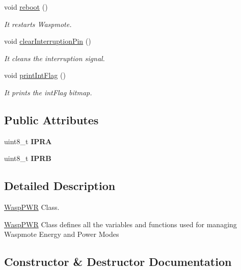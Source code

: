 \begin{DoxyCompactItemize}
void \hyperlink{class_wasp_p_w_r_a6cd2a849cbdeb7a525b39da989cf0283}{reboot} ()
\begin{DoxyCompactList}\small\item\em It restarts Waspmote. \end{DoxyCompactList}\item 
void \hyperlink{class_wasp_p_w_r_aefed3fd8e97164117415b18b475fca61}{clear\+Interruption\+Pin} ()
\begin{DoxyCompactList}\small\item\em It cleans the interruption signal. \end{DoxyCompactList}\item 
void \hyperlink{class_wasp_p_w_r_a13d4ee1bab7f75051d261cb34835c242}{print\+Int\+Flag} ()
\begin{DoxyCompactList}\small\item\em It prints the \textquotesingle{}int\+Flag\textquotesingle{} bitmap. \end{DoxyCompactList}\end{DoxyCompactItemize}
\subsection*{Public Attributes}
\begin{DoxyCompactItemize}
\item 
uint8\+\_\+t {\bfseries I\+P\+RA}\hypertarget{class_wasp_p_w_r_aec0100e8fa45adad6399e75cfaa3ab56}{}\label{class_wasp_p_w_r_aec0100e8fa45adad6399e75cfaa3ab56}

\item 
uint8\+\_\+t {\bfseries I\+P\+RB}\hypertarget{class_wasp_p_w_r_ace0eaf3896fac24ab1e328ec6cf97732}{}\label{class_wasp_p_w_r_ace0eaf3896fac24ab1e328ec6cf97732}

\end{DoxyCompactItemize}


\subsection{Detailed Description}
\hyperlink{class_wasp_p_w_r}{Wasp\+P\+WR} Class. 

\hyperlink{class_wasp_p_w_r}{Wasp\+P\+WR} Class defines all the variables and functions used for managing Waspmote Energy and Power Modes 

\subsection{Constructor \& Destructor Documentation}
